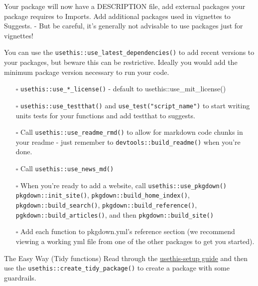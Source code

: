 \documentclass[
  letterpaper,
  DIV=11,
  numbers=noendperiod]{scrreprt}
\providecommand{\tightlist}{%
  \setlength{\itemsep}{0pt}\setlength{\parskip}{0pt}}\usepackage{longtable,booktabs,array}
\begin{document}
\begin{tcolorbox}[enhanced jigsaw, colback=white, opacitybacktitle=0.6, coltitle=black, left=2mm, breakable, bottomtitle=1mm, toptitle=1mm, toprule=.15mm, colframe=quarto-callout-tip-color-frame, titlerule=0mm, title=\textcolor{quarto-callout-tip-color}{\faLightbulb}\hspace{0.5em}{DESCRIPTION}, colbacktitle=quarto-callout-tip-color!10!white, rightrule=.15mm, bottomrule=.15mm, arc=.35mm, opacityback=0, leftrule=.75mm]

Your package will now have a DESCRIPTION file, add external packages
your package requires to Imports. Add additional packages used in
vignettes to Suggests. - But be careful, it's generally not advisable to
use packages just for vignettes!

You can use the \texttt{usethis::use\_latest\_dependencies()} to add
recent versions to your packages, but beware this can be restrictive.
Ideally you would add the minimum package version necessary to run your
code.

\end{tcolorbox}

\begin{itemize}
\tightlist
\item[$\square$]
  \texttt{usethis::use\_*\_license()} - default to
  usethis::use\_mit\_license()
\item[$\square$]
  \texttt{usethis::use\_testthat()} and
  \texttt{use\_test("script\_name")} to start writing units tests for
  your functions and add testthat to suggests.
\item[$\square$]
  Call \texttt{usethis::use\_readme\_rmd()} to allow for markdown code
  chunks in your readme - just remember to
  \texttt{devtools::build\_readme()} when you're done.
\item[$\square$]
  Call \texttt{usethis::use\_news\_md()}
\item[$\square$]
  When you're ready to add a website, call
  \texttt{usethis::use\_pkgdown()} \texttt{pkgdown::init\_site()},
  \texttt{pkgdown::build\_home\_index()},
  \texttt{pkgdown::build\_search()},
  \texttt{pkgdown::build\_reference()},
  \texttt{pgkdown::build\_articles()}, and then
  \texttt{pkgdown::build\_site()}
\item[$\square$]
  Add each function to pkgdown.yml's reference section (we recommend
  viewing a working yml file from one of the other packages to get you
  started).
\end{itemize}

The Easy Way (Tidy functions) Read through the
\href{https://usethis.r-lib.org/articles/usethis-setup.html}{usethis-setup
guide} and then use the \texttt{usethis::create\_tidy\_package()} to
create a package with some guardrails.
\end{document}
